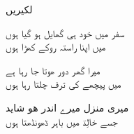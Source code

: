 \documentclass[a4paper]{article}
\begin{document}
\RTL  
\setlength{\parindent}{0pt}
\setlength{\parskip}{18pt}
\fontsize{48pt}{48pt}\linespread{1}\amiri
\begin{center}
لکیریں
\end{center}
\fontsize{18pt}{18pt}\linespread{2.5}\notourdu
سفر میں خود ہی گھایل ہو گیا ہوں\\
میں اپنا راستہ روکے کھڑا ہوں

میرا گھر دور ھوتا جا رہا ہے\\
میں پیچھے کی ترف چلتا رہا ہوں

میری منزل میرے اندر ھو شاید\\
جسے خالِدؔ میں باہر ڈھونڈھتا ہوں
\end{document}
